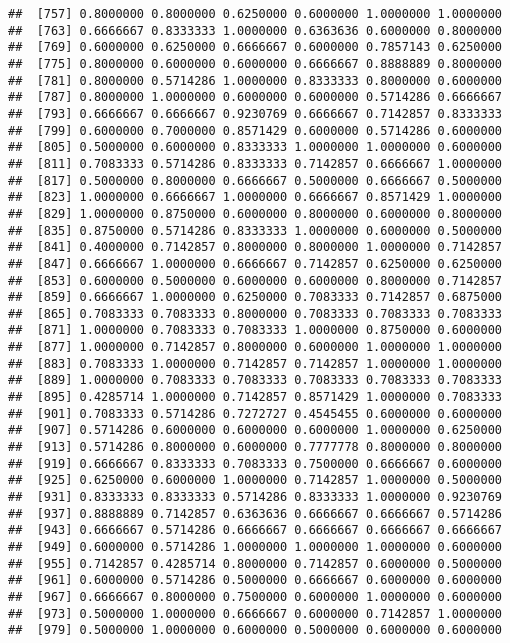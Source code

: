 \documentclass[]{article}
\begin{document}
\begin{verbatim}
##  [757] 0.8000000 0.8000000 0.6250000 0.6000000 1.0000000 1.0000000
##  [763] 0.6666667 0.8333333 1.0000000 0.6363636 0.6000000 0.8000000
##  [769] 0.6000000 0.6250000 0.6666667 0.6000000 0.7857143 0.6250000
##  [775] 0.8000000 0.6000000 0.6000000 0.6666667 0.8888889 0.8000000
##  [781] 0.8000000 0.5714286 1.0000000 0.8333333 0.8000000 0.6000000
##  [787] 0.8000000 1.0000000 0.6000000 0.6000000 0.5714286 0.6666667
##  [793] 0.6666667 0.6666667 0.9230769 0.6666667 0.7142857 0.8333333
##  [799] 0.6000000 0.7000000 0.8571429 0.6000000 0.5714286 0.6000000
##  [805] 0.5000000 0.6000000 0.8333333 1.0000000 1.0000000 0.6000000
##  [811] 0.7083333 0.5714286 0.8333333 0.7142857 0.6666667 1.0000000
##  [817] 0.5000000 0.8000000 0.6666667 0.5000000 0.6666667 0.5000000
##  [823] 1.0000000 0.6666667 1.0000000 0.6666667 0.8571429 1.0000000
##  [829] 1.0000000 0.8750000 0.6000000 0.8000000 0.6000000 0.8000000
##  [835] 0.8750000 0.5714286 0.8333333 1.0000000 0.6000000 0.5000000
##  [841] 0.4000000 0.7142857 0.8000000 0.8000000 1.0000000 0.7142857
##  [847] 0.6666667 1.0000000 0.6666667 0.7142857 0.6250000 0.6250000
##  [853] 0.6000000 0.5000000 0.6000000 0.6000000 0.8000000 0.7142857
##  [859] 0.6666667 1.0000000 0.6250000 0.7083333 0.7142857 0.6875000
##  [865] 0.7083333 0.7083333 0.8000000 0.7083333 0.7083333 0.7083333
##  [871] 1.0000000 0.7083333 0.7083333 1.0000000 0.8750000 0.6000000
##  [877] 1.0000000 0.7142857 0.8000000 0.6000000 1.0000000 1.0000000
##  [883] 0.7083333 1.0000000 0.7142857 0.7142857 1.0000000 1.0000000
##  [889] 1.0000000 0.7083333 0.7083333 0.7083333 0.7083333 0.7083333
##  [895] 0.4285714 1.0000000 0.7142857 0.8571429 1.0000000 0.7083333
##  [901] 0.7083333 0.5714286 0.7272727 0.4545455 0.6000000 0.6000000
##  [907] 0.5714286 0.6000000 0.6000000 0.6000000 1.0000000 0.6250000
##  [913] 0.5714286 0.8000000 0.6000000 0.7777778 0.8000000 0.8000000
##  [919] 0.6666667 0.8333333 0.7083333 0.7500000 0.6666667 0.6000000
##  [925] 0.6250000 0.6000000 1.0000000 0.7142857 1.0000000 0.5000000
##  [931] 0.8333333 0.8333333 0.5714286 0.8333333 1.0000000 0.9230769
##  [937] 0.8888889 0.7142857 0.6363636 0.6666667 0.6666667 0.5714286
##  [943] 0.6666667 0.5714286 0.6666667 0.6666667 0.6666667 0.6666667
##  [949] 0.6000000 0.5714286 1.0000000 1.0000000 1.0000000 0.6000000
##  [955] 0.7142857 0.4285714 0.8000000 0.7142857 0.6000000 0.5000000
##  [961] 0.6000000 0.5714286 0.5000000 0.6666667 0.6000000 0.6000000
##  [967] 0.6666667 0.8000000 0.7500000 0.6000000 1.0000000 0.6000000
##  [973] 0.5000000 1.0000000 0.6666667 0.6000000 0.7142857 1.0000000
##  [979] 0.5000000 1.0000000 0.6000000 0.5000000 0.6000000 0.6000000

\end{verbatim}
\end{document}
